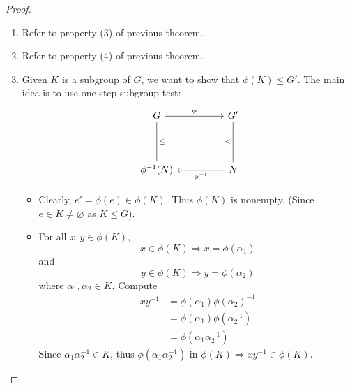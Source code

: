 \begin{proof}
\begin{enumerate}
        \item Refer to property (3) of previous theorem.
        \item Refer to property (4) of previous theorem.
        \item Given $K$ is a subgroup of $G$, we want to show that $\phi(K) \leq G'$. The main idea is to use one-step subgroup test:
        \[\begin{tikzcd}[row sep=2.0em]
            G \arrow["\phi"]{rr} \arrow[dash, "\leq"]{dd} & & G' \\
            \\
            \phi^{-1}(N)  & & N \arrow[dash, "\leq"]{uu} \arrow["\phi^{-1}"]{ll}
        \end{tikzcd}
        \]
        \begin{itemize}
            \item Clearly, $e' = \phi(e) \in \phi(K)$. Thus $\phi(K)$ is nonempty. (Since $e \in K \neq \varnothing$ as $K \leq G$).
            \item For all $x,y \in \phi(K)$, 
            \[
                x \in \phi(K) \Rightarrow x = \phi(\alpha_1)
            \]
            and 
            \[
                y \in \phi(K) \Rightarrow y = \phi(\alpha_2)
            \]
            where $\alpha_1, \alpha_2 \in K$. Compute 
            \begin{align*}
                xy^{-1} &= \phi(\alpha_1) \phi(\alpha_2)^{-1}\\
                &= \phi(\alpha_1) \phi(\alpha_2^{-1})\\
                &= \phi(\alpha_1 \alpha_2^{-1})
            \end{align*}
            Since $\alpha_1 \alpha_2^{-1} \in K$, thus $\phi(\alpha_1 \alpha_2^{-1})$ in $\phi(K) \Longrightarrow xy^{-1} \in \phi(K)$.

        \end{itemize}
    \end{enumerate}
\end{proof}

